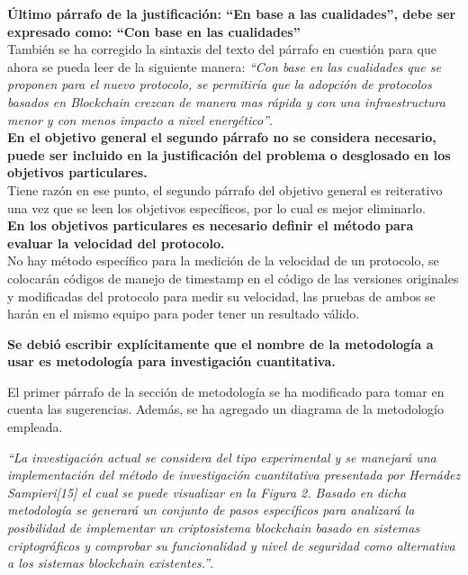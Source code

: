 \documentclass[10pt,a4paper,roman]{moderncv}        %
\begin{document}
\textbf{Último párrafo de la justificación: “En base a las cualidades”, debe ser expresado como: “Con base en las cualidades”}\\
\hfill \break
También se ha corregido la sintaxis del texto del párrafo en cuestión para que ahora se pueda leer de la siguiente manera:
\hfill \break  
\textit{``Con base en las cualidades que se proponen para el nuevo protocolo, se permitiría que la adopción de protocolos basados en Blockchain crezcan de manera mas rápida y con una infraestructura menor y con menos impacto a nivel energético''}.\\
\hfill \break
\textbf{En el objetivo general el segundo párrafo no se considera necesario, puede ser incluido en la justificación del problema o desglosado en los objetivos particulares.}\\
\hfill \break
Tiene razón en ese punto, el segundo párrafo del objetivo general es reiterativo una vez que se leen los objetivos específicos, por lo cual es mejor eliminarlo.\\
\hfill \break
\textbf{En los objetivos particulares es necesario definir el método para evaluar la velocidad del protocolo.}\\
\hfill \break
No hay método específico para la medición de la velocidad de un protocolo, se colocarán códigos de manejo de timestamp en el código de las versiones originales y modificadas del protocolo para medir su velocidad, las pruebas de ambos se harán en el mismo equipo para poder tener un resultado válido.
 
\hfill \break
\textbf{Se debió escribir explícitamente que el nombre de la metodología a usar es metodología para investigación cuantitativa.}

\hfill \break
El primer párrafo de la sección de metodología se ha modificado para tomar en cuenta las sugerencias. Además, se ha agregado un diagrama de la metodologío empleada.
\hfill \break
 
\textit{``La investigación actual se considera del tipo experimental y se manejará una implementación del método de investigación cuantitativa presentada por Hernádez Sampieri[15] el cual se puede visualizar en la Figura 2. Basado en dicha metodología se generará un conjunto de pasos específicos para analizará la posibilidad de implementar un criptosistema blockchain basado en sistemas criptográficos y comprobar su funcionalidad y nivel de seguridad como alternativa a los sistemas blockchain existentes.''}.\\
\hfill \break
\end{document}
